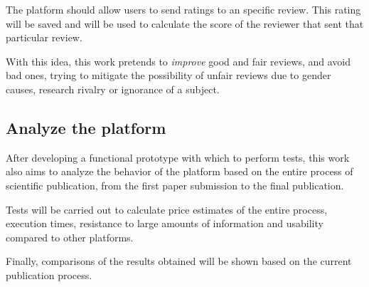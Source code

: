 The platform should allow users to send ratings to an specific review. This
rating will be saved and will be used to calculate the score of the reviewer
that sent that particular review.

With this idea, this work pretends to \emph{improve} good and fair reviews, and
avoid bad ones, trying to mitigate the possibility of unfair reviews due to
gender causes, research rivalry or ignorance of a subject.

\subsection*{Analyze the platform}

After developing a functional prototype with which to perform tests, this work
also aims to analyze the behavior of the platform based on the entire process of
scientific publication, from the first paper submission to the final
publication.

Tests will be carried out to calculate price estimates of the entire process,
execution times, resistance to large amounts of information and usability
compared to other platforms.

Finally, comparisons of the results obtained will be shown based on the current
publication process.

